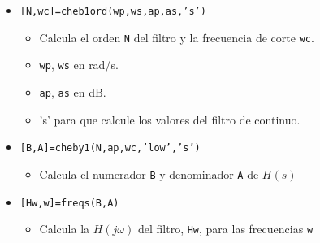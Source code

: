 \begin{frame}
\begin{itemize}
    \begin{itemize}
      \item \alert{\texttt{[N,wc]=cheb1ord(wp,ws,ap,as,'s')}}
      \begin{itemize}
        \color{gray}
        \item Calcula el orden \texttt{N} del filtro y la frecuencia de corte \texttt{wc}.
        \item \texttt{wp}, \texttt{ws} en rad/s.
        \item \texttt{ap}, \texttt{as} en dB.
        \item 's' para que calcule los valores del filtro de continuo.
      \end{itemize}
      \item \alert{\texttt{[B,A]=cheby1(N,ap,wc,'low','s')}}
      \begin{itemize}
        \color{gray}
        \item Calcula el numerador \texttt{B} y denominador \texttt{A} de $H(s)$
      \end{itemize}
      \item \alert{\texttt{[Hw,w]=freqs(B,A)}}
      \begin{itemize}
        \color{gray}
        \item Calcula la $H(j\omega)$ del filtro, \texttt{Hw}, para las frecuencias \texttt{w}
      \end{itemize}
        
    \end{itemize}
    
  \end{itemize}
\end{frame}
  
  
  

